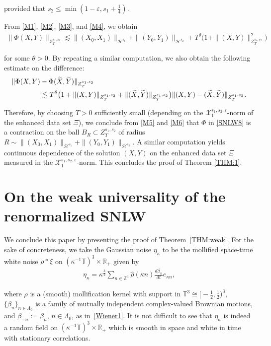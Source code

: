 \documentclass[%
11pt,  reqno]{amsart}
\newcommand{\1}{\hspace{0.2mm}\text{I}\hspace{0.2mm}}
\newcommand{\noi}{\noindent}
\newcommand{\Z}{\mathbb{Z}}
\newcommand{\R}{\mathbb{R}}
\newcommand{\T}{\mathbb{T}}
\newcommand{\be}{\beta}
\newcommand{\eps}{\varepsilon}
\newcommand{\kk}{\kappa}
\newcommand{\Ld}{\Lambda}
\newcommand{\ft}{\widehat}
\newcommand{\wt}{\widetilde}
\newcommand{\cj}{\overline}
\newcommand{\ta}{\theta}
\newcommand{\les}{\lesssim}
\renewcommand{\H}{\mathcal{H}}
\numberwithin{equation}{section}
\numberwithin{theorem}{section}
\begin{document}
\noi
provided that $s_2 \leq \min(1 -\eps, s_1 + \frac 14)$.

From \eqref{M1}, \eqref{M2}, \eqref{M3}, and \eqref{M4}, we obtain 
\begin{align}
\| \Phi(X, Y) \|_{Z^{s_1, s_2}_T}
\les 
\| (X_0, X_1) \|_{\H^{s_1}}
+ 
\| (Y_0, Y_1) \|_{\H^{s_2}}
+ 
T^\ta \big( 1 + \|(X, Y)\|_{Z^{s_1, s_2}_T}^2\big)
\label{M5}
\end{align}


\noi
for some $\ta > 0$.
By repeating a similar computation, 
we also obtain the following estimate on the difference: 
\begin{align}
\| \Phi(X, Y) & - \Phi(\wt X, \wt Y)\|_{Z^{s_1, s_2}_T}\notag\\
& \les 
T^\ta \big( 1 + \|(X, Y)\|_{Z^{s_1, s_2}_T} + \|(\wt X, \wt Y)\|_{Z^{s_1, s_2}_T} \big) 
 \|(X, Y) - (\wt X, \wt Y) \|_{Z^{s_1, s_2}_T}.
\label{M6}
\end{align}

\noi
Therefore, by choosing $T>0$ sufficiently small
(depending on the $\mathcal{X}^{s_1, s_2,\eps}_1$-norm
of the  enhanced data set $\Xi$), 
we conclude from \eqref{M5} and \eqref{M6} that $\Phi$ in \eqref{SNLW8}
is a contraction on the ball $B_R \subset Z^{s_1, s_2}_T$
of radius $R\sim 
\| (X_0, X_1) \|_{\H^{s_1}}
+ \| (Y_0, Y_1) \|_{\H^{s_2}}$.
A similar computation yields 
continuous dependence of the solution $(X, Y)$
on the enhanced data set $\Xi$
measured in the $\mathcal{X}^{s_1, s_2,\eps}_1$-norm.
This concludes the proof of 
Theorem \ref{THM:1}.






\section{On the weak universality of the renormalized SNLW}


We conclude this paper by presenting the proof of
Theorem~\ref{THM:weak}. 
For the sake of concreteness, 
we take the Gaussian noise $\eta_\kk$ %
to be the mollified space-time white noise $\rho * \xi$ on $(\kk^{-1} \T)^3 \times \R_+$
given by 
\begin{align}
\eta_\kk  
=  \kk^{\frac{3}{2}} \sum_{n\in \Z^3}  \ft \rho (\kk n)  \frac{d\beta_n}{dt} e_{\kk n},
\label{eta-kappa}
\end{align}

\noi
where $\rho$ is a (smooth) 
mollification kernel with  support in $\T^3 \cong \big[-\frac 12,\frac 12\big)^3$, 
 $\{\beta_n\}_{n \in \Ld_0}$
 is a family of mutually independent complex-valued
Brownian motions, and   $\beta_{-n} := \cj{\be_n}$, $n \in \Ld_0$,  as in~\eqref{Wiener1}. 
It is not difficult to see that $\eta_\kk$ is indeed a random field on 
$(\kk^{-1} \T)^3\times \R_+$ which is smooth in space and white in time with stationary correlations. 
\end{document}
